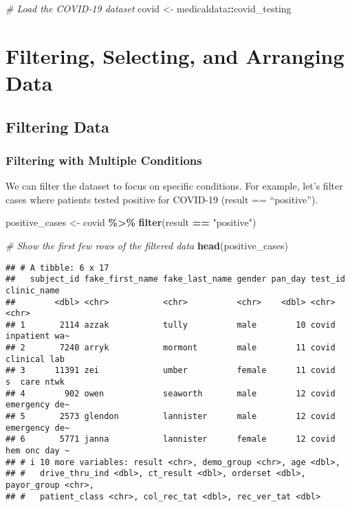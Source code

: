 \documentclass[
]{book}
\newenvironment{Shaded}{\begin{snugshade}}{\end{snugshade}}
\newcommand{\CommentTok}[1]{\textcolor[rgb]{0.56,0.35,0.01}{\textit{#1}}}
\newcommand{\FunctionTok}[1]{\textcolor[rgb]{0.13,0.29,0.53}{\textbf{#1}}}
\newcommand{\NormalTok}[1]{#1}
\newcommand{\OtherTok}[1]{\textcolor[rgb]{0.56,0.35,0.01}{#1}}
\newcommand{\SpecialCharTok}[1]{\textcolor[rgb]{0.81,0.36,0.00}{\textbf{#1}}}
\newcommand{\StringTok}[1]{\textcolor[rgb]{0.31,0.60,0.02}{#1}}
\begin{document}
\begin{Shaded}
\begin{Highlighting}[]
\CommentTok{\# Load the COVID{-}19 dataset}
\NormalTok{covid }\OtherTok{\textless{}{-}}\NormalTok{ medicaldata}\SpecialCharTok{::}\NormalTok{covid\_testing}
\end{Highlighting}
\end{Shaded}

\section{Filtering, Selecting, and Arranging Data}\label{filtering-selecting-and-arranging-data}

\subsection{Filtering Data}\label{filtering-data}

\subsubsection{Filtering with Multiple Conditions}\label{filtering-with-multiple-conditions}

We can filter the dataset to focus on specific conditions. For example, let's filter cases where patients tested positive for COVID-19 (result == ``positive'').

\begin{Shaded}
\begin{Highlighting}[]
\NormalTok{positive\_cases }\OtherTok{\textless{}{-}}\NormalTok{ covid }\SpecialCharTok{\%\textgreater{}\%} 
  \FunctionTok{filter}\NormalTok{(result }\SpecialCharTok{==} \StringTok{"positive"}\NormalTok{)}

\CommentTok{\# Show the first few rows of the filtered data}
\FunctionTok{head}\NormalTok{(positive\_cases)}
\end{Highlighting}
\end{Shaded}

\begin{verbatim}
## # A tibble: 6 x 17
##   subject_id fake_first_name fake_last_name gender pan_day test_id clinic_name  
##        <dbl> <chr>           <chr>          <chr>    <dbl> <chr>   <chr>        
## 1       2114 azzak           tully          male        10 covid   inpatient wa~
## 2       7240 arryk           mormont        male        11 covid   clinical lab 
## 3      11391 zei             umber          female      11 covid   s  care ntwk 
## 4        902 owen            seaworth       male        12 covid   emergency de~
## 5       2573 glendon         lannister      male        12 covid   emergency de~
## 6       5771 janna           lannister      female      12 covid   hem onc day ~
## # i 10 more variables: result <chr>, demo_group <chr>, age <dbl>,
## #   drive_thru_ind <dbl>, ct_result <dbl>, orderset <dbl>, payor_group <chr>,
## #   patient_class <chr>, col_rec_tat <dbl>, rec_ver_tat <dbl>
\end{verbatim}
\end{document}
